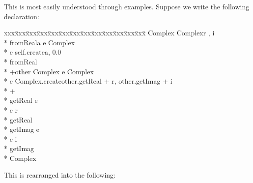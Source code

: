 This is most easily understood through examples.  Suppose we write the
following declaration: 

{\small\it\begin{minipage}{\textwidth}\begin{tabbing}
xxx\=xxx\=xxx\=xxx\=xxx\=xxx\=xxx\=xxx\=xxx\=xxx\=xxx\=xxx\=xxx\=\+\kill%
 Complex \assign{}   Complex\/\LB{}r \CO{} , i \CO{} \/\RB{}\+\\*{}%
     fromReal\/\LB{}a \CO{} \/\RB{} \returns{} \/\LB{}e \CO{} Complex\/\RB{}\+\\*{}%
    e \assign{} self.create\/\LB{}a, 0.0\/\RB{}\-\\*{}%
   fromReal\\*{}%
    $+$\/\LB{}other \CO{} Complex\/\RB{} \returns{} \/\LB{}e \CO{} Complex\/\RB{}\+\\*{}%
    e \assign{} Complex.create\/\LB{}other.getReal $+$ r, other.getImag $+$ i\/\RB{}\-\\*{}%
   $+$\\*{}%
    getReal \returns{} \/\LB{}e \CO{} \/\RB{}\+\\*{}%
    e \assign{} r\-\\*{}%
   getReal\\*{}%
    getImag \returns{} \/\LB{}e \CO{} \/\RB{}\+\\*{}%
    e \assign{} i\-\\*{}%
   getImag\-\\*{}%
 Complex
\end{tabbing}\end{minipage}}

This is rearranged into the following:

